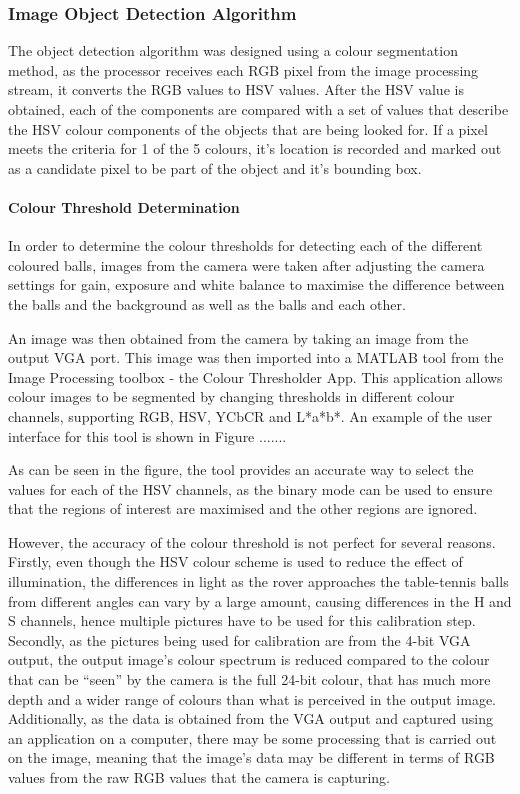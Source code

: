 \documentclass[a4paper]{article}
\begin{document}
\subsubsection{Image Object Detection Algorithm}

The object detection algorithm was designed using a colour segmentation method, as 
the processor receives each RGB pixel from the image processing stream, it converts the 
RGB values to HSV values. After the HSV value is obtained, each of the components 
are compared with a set of values that describe the HSV colour components of the objects 
that are being looked for. If a pixel meets the criteria for 1 of the 5 colours, it's 
location is recorded and marked out as a candidate pixel to be part of the object and 
it's bounding box. 

\paragraph*{Colour Threshold Determination}

In order to determine the colour thresholds for detecting each of the different 
coloured balls, images from the camera were taken after adjusting the camera settings
for gain, exposure and white balance to maximise the difference between the balls 
and the background as well as the balls and each other. 

An image was then obtained from the camera by taking an image from the output VGA 
port. This image was then imported into a MATLAB tool from the Image Processing toolbox - 
the Colour Thresholder App. This application allows colour images to be segmented by changing
thresholds in different colour channels, supporting RGB, HSV, YCbCR and L*a*b*. An example of 
the user interface for this tool is shown in Figure .......

As can be seen in the figure, the tool provides an accurate way to select the values 
for each of the HSV channels, as the binary mode can be used to ensure that the regions
of interest are maximised and the other regions are ignored. 

However, the accuracy of the colour threshold is not perfect for several reasons.
Firstly, even though the HSV colour scheme is used to reduce the effect of illumination, 
the differences in light as the rover approaches the table-tennis balls from different angles
can vary by a large amount, causing differences in the H and S channels, 
hence multiple pictures have to be used for this calibration step. 
Secondly, as the pictures being used for calibration are from the 4-bit VGA output, 
the output image's colour spectrum is reduced compared to the colour that can be
 ``seen'' by the camera is the full 24-bit colour, that has much more depth and 
a wider range of colours than what is perceived in the output image. Additionally, 
as the data is obtained from the VGA output and captured using an application on 
a computer, there may be some processing that is carried out on the image, meaning 
that the image's data may be different in terms of RGB values from the raw RGB values
that the camera is capturing. 
\end{document}
